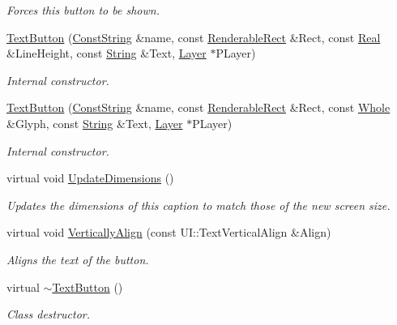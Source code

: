 \begin{DoxyCompactItemize}
\begin{DoxyCompactList}\small\item\em Forces this button to be shown. \item\end{DoxyCompactList}\item 
\hyperlink{classphys_1_1UI_1_1TextButton_aa7cf2c89310ead3a15413ca1a278253e}{TextButton} (\hyperlink{namespacephys_a5ce5049f8b4bf88d6413c47b504ebb31}{ConstString} \&name, const \hyperlink{structphys_1_1UI_1_1RenderableRect}{RenderableRect} \&Rect, const \hyperlink{namespacephys_af7eb897198d265b8e868f45240230d5f}{Real} \&LineHeight, const \hyperlink{namespacephys_aa03900411993de7fbfec4789bc1d392e}{String} \&Text, \hyperlink{classphys_1_1UI_1_1Layer}{Layer} $\ast$PLayer)
\begin{DoxyCompactList}\small\item\em Internal constructor. \item\end{DoxyCompactList}\item 
\hyperlink{classphys_1_1UI_1_1TextButton_a0ac20e0541794bbc6d708fe3be6acb26}{TextButton} (\hyperlink{namespacephys_a5ce5049f8b4bf88d6413c47b504ebb31}{ConstString} \&name, const \hyperlink{structphys_1_1UI_1_1RenderableRect}{RenderableRect} \&Rect, const \hyperlink{namespacephys_a460f6bc24c8dd347b05e0366ae34f34a}{Whole} \&Glyph, const \hyperlink{namespacephys_aa03900411993de7fbfec4789bc1d392e}{String} \&Text, \hyperlink{classphys_1_1UI_1_1Layer}{Layer} $\ast$PLayer)
\begin{DoxyCompactList}\small\item\em Internal constructor. \item\end{DoxyCompactList}\item 
virtual void \hyperlink{classphys_1_1UI_1_1TextButton_a5099be328baf55b9925227d11128c328}{UpdateDimensions} ()
\begin{DoxyCompactList}\small\item\em Updates the dimensions of this caption to match those of the new screen size. \item\end{DoxyCompactList}\item 
virtual void \hyperlink{classphys_1_1UI_1_1TextButton_adbd6f7c69f78dfcba1054591e3afb838}{VerticallyAlign} (const UI::TextVerticalAlign \&Align)
\begin{DoxyCompactList}\small\item\em Aligns the text of the button. \item\end{DoxyCompactList}\item 
\hypertarget{classphys_1_1UI_1_1TextButton_a1f28489fee45ee8ce7e1b0aea0f249a1}{
virtual \hyperlink{classphys_1_1UI_1_1TextButton_a1f28489fee45ee8ce7e1b0aea0f249a1}{$\sim$TextButton} ()}
\label{classphys_1_1UI_1_1TextButton_a1f28489fee45ee8ce7e1b0aea0f249a1}

\begin{DoxyCompactList}\small\item\em Class destructor. \item\end{DoxyCompactList}\end{DoxyCompactItemize}
